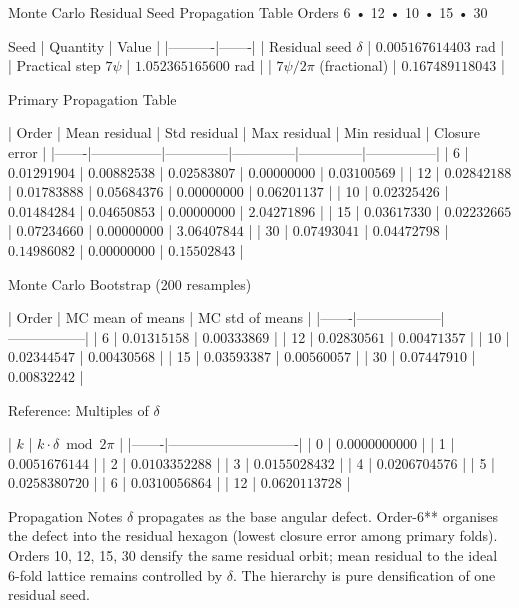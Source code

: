 Monte Carlo Residual Seed Propagation Table  
Orders 6 • 12 • 10 • 15 • 30

Seed
| Quantity | Value |
|----------|-------|
| Residual seed \(\delta\) | \(0.005167614403\) rad |
| Practical step \(7\psi\) | \(1.052365165600\) rad |
| \(7\psi / 2\pi\) (fractional) | \(0.167489118043\) |

Primary Propagation Table

| Order | Mean residual | Std residual | Max residual | Min residual | Closure error |
|-------|---------------|--------------|--------------|--------------|---------------|
| 6 | \(0.01291904\) | \(0.00882538\) | \(0.02583807\) | \(0.00000000\) | \(0.03100569\) |
| 12 | \(0.02842188\) | \(0.01783888\) | \(0.05684376\) | \(0.00000000\) | \(0.06201137\) |
| 10 | \(0.02325426\) | \(0.01484284\) | \(0.04650853\) | \(0.00000000\) | \(2.04271896\) |
| 15 | \(0.03617330\) | \(0.02232665\) | \(0.07234660\) | \(0.00000000\) | \(3.06407844\) |
| 30 | \(0.07493041\) | \(0.04472798\) | \(0.14986082\) | \(0.00000000\) | \(0.15502843\) |

Monte Carlo Bootstrap (200 resamples)

| Order | MC mean of means | MC std of means |
|-------|------------------|-----------------|
| 6 | \(0.01315158\) | \(0.00333869\) |
| 12 | \(0.02830561\) | \(0.00471357\) |
| 10 | \(0.02344547\) | \(0.00430568\) |
| 15 | \(0.03593387\) | \(0.00560057\) |
| 30 | \(0.07447910\) | \(0.00832242\) |

Reference: Multiples of \(\delta\)

| \(k\) | \(k\cdot\delta \bmod 2\pi\) |
|-------|----------------------------|
| 0 | \(0.0000000000\) |
| 1 | \(0.0051676144\) |
| 2 | \(0.0103352288\) |
| 3 | \(0.0155028432\) |
| 4 | \(0.0206704576\) |
| 5 | \(0.0258380720\) |
| 6 | \(0.0310056864\) |
| 12 | \(0.0620113728\) |

Propagation Notes
\(\delta\) propagates as the base angular defect.
Order-6** organises the defect into the residual hexagon (lowest closure error among primary folds).
Orders 10, 12, 15, 30 densify the same residual orbit; mean residual to the ideal 6-fold lattice remains controlled by \(\delta\).
The hierarchy is pure densification of one residual seed.
